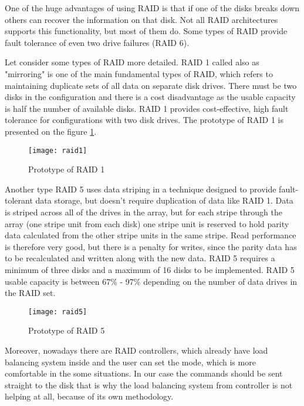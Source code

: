One of the huge advantages of using RAID is that if one of the disks breaks down others can recover the information on that disk. Not all RAID architectures supports this functionality, but most of them do. Some types of RAID provide fault tolerance of even two drive failures (RAID 6).

Let consider some types of RAID more detailed. RAID 1 called also as "mirroring" is one of the main fundamental types of RAID, which refers to maintaining duplicate sets of all data on separate disk drives. There must be two disks in the configuration and there is a cost disadvantage as the usable
capacity is half the number of available disks. RAID 1 provides cost-effective, high fault tolerance for configurations with two disk drives. The prototype of RAID 1 is presented on the figure \ref{fig:raid1}.
\begin{figure}[h]
\begin{center}
  \texttt{[image: raid1]}
\end{center}
  \caption{Prototype of RAID 1}
  \label{fig:raid1}
\end{figure}

Another type RAID 5 uses data striping in a technique designed to provide fault-tolerant data storage, but doesn't require duplication of data like RAID 1. Data is striped across all of the drives in the array, but for each stripe through the array (one stripe unit from each disk) one stripe unit is reserved to hold parity data calculated from the other stripe units in the same stripe. Read performance is therefore very good, but there is a penalty for writes, since the parity data has to be recalculated and written along with the new data. RAID 5 requires a minimum of three disks and a maximum of 16 disks to be implemented. RAID 5 usable capacity is between 67\% - 97\% depending on the number of data drives in the RAID set.
\begin{figure}[h]
\begin{center}
  \texttt{[image: raid5]}
\end{center}
  \caption{Prototype of RAID 5}
  \label{fig:raid5}
\end{figure}



Moreover, nowadays there are RAID controllers, which already have load balancing system inside and the user can set the mode, which is more comfortable in the some situations. In our case the commands should be sent straight to the disk that is why the load balancing system from controller is not helping at all, because of its own methodology.  


